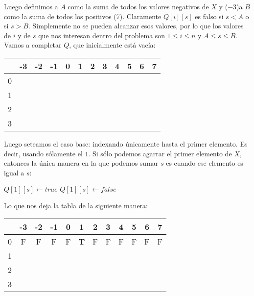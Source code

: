 Luego definimos a $A$ como la suma de todos los valores negativos de $X$ y  ($-3$)a $B$ como la suma de todos los positivos (7). Claramente $Q[i][s]$ es falso si $s < A$ o si $s > B$. Simplemente no se pueden alcanzar esos valores, por lo que los valores de $i$ y de $s$ que nos interesan dentro del problema son $1 \leq i \leq n$ y $A \leq s \leq B$. Vamos a completar $Q$, que inicialmente est\'a vac\'ia:

\begin{center}
  \begin{tabular}{ | c | c | c | c | c | c | c | c | c | c | c | c | }
    \hline
      & -3 & -2 & -1 & 0 & 1 & 2 & 3 & 4 & 5 & 6 & 7 \\ \hline
    0 &    &    &    &   &   &   &   &   &   &   &   \\ \hline
    1 &    &    &    &   &   &   &   &   &   &   &   \\ \hline
    2 &    &    &    &   &   &   &   &   &   &   &   \\ \hline
    3 &    &    &    &   &   &   &   &   &   &   &   \\ \hline
  \end{tabular}
\end{center}

Luego seteamos el caso base: indexando \'unicamente hasta el primer elemento. Es decir, usando s\'olamente el $1$. Si s\'olo podemos agarrar el primer elemento de $X$, entonces la \'unica manera en la que podemos sumar $s$ es cuando ese elemento es igual a $s$:

\begin{algorithm}
\begin{algorithmic}[1]
    \State $Q[1][s] \gets true$
  \Else
    \State $Q[1][s] \gets false$
  \EndIf
\EndFor
\end{algorithmic}
\end{algorithm}

Lo que nos deja la tabla de la siguiente manera:

\begin{center}
  \begin{tabular}{ | c | c | c | c | c | c | c | c | c | c | c | c | }
    \hline
      & -3 & -2 & -1 & 0 & 1 & 2 & 3 & 4 & 5 & 6 & 7 \\ \hline
    0 &  F & F  &  F & F & \textbf{T}  & F  &  F & F  & F  & F  & F  \\ \hline
    1 &    &    &    &   &   &   &   &   &   &   &   \\ \hline
    2 &    &    &    &   &   &   &   &   &   &   &   \\ \hline
    3 &    &    &    &   &   &   &   &   &   &   &   \\ \hline
  \end{tabular}
\end{center}

